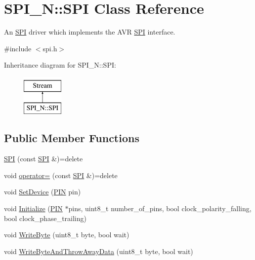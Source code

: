 \hypertarget{class_s_p_i___n_1_1_s_p_i}{}\section{S\+P\+I\+\_\+N\+:\+:S\+PI Class Reference}
\label{class_s_p_i___n_1_1_s_p_i}


An \hyperlink{class_s_p_i___n_1_1_s_p_i}{S\+PI} driver which implements the A\+VR \hyperlink{class_s_p_i___n_1_1_s_p_i}{S\+PI} interface.  




{\ttfamily \#include $<$spi.\+h$>$}

Inheritance diagram for S\+P\+I\+\_\+N\+:\+:S\+PI\+:\begin{figure}[H]
\begin{center}
\leavevmode
\includegraphics[height=2.000000cm]{class_s_p_i___n_1_1_s_p_i}
\end{center}
\end{figure}
\subsection*{Public Member Functions}
\begin{DoxyCompactItemize}
\item 
\hyperlink{class_s_p_i___n_1_1_s_p_i_ab486ba0f0d9ec880520e568762cc6c7d}{S\+PI} (const \hyperlink{class_s_p_i___n_1_1_s_p_i}{S\+PI} \&)=delete
\item 
void \hyperlink{class_s_p_i___n_1_1_s_p_i_aabc66612d396c2b70e5cbdba405dbfe5}{operator=} (const \hyperlink{class_s_p_i___n_1_1_s_p_i}{S\+PI} \&)=delete
\item 
void \hyperlink{class_s_p_i___n_1_1_s_p_i_a23f01675382512e51095ef1d6e257956}{Set\+Device} (\hyperlink{struct_s_p_i___n_1_1_p_i_n}{P\+IN} pin)
\item 
void \hyperlink{class_s_p_i___n_1_1_s_p_i_ab0517cd53e32d224a0171e6eeb200870}{Initialize} (\hyperlink{struct_s_p_i___n_1_1_p_i_n}{P\+IN} $\ast$pins, uint8\+\_\+t number\+\_\+of\+\_\+pins, bool clock\+\_\+polarity\+\_\+falling, bool clock\+\_\+phase\+\_\+trailing)
\item 
void \hyperlink{class_s_p_i___n_1_1_s_p_i_a542dc8e88203de7040ce9926d06b9463}{Write\+Byte} (uint8\+\_\+t byte, bool wait)
\item 
void \hyperlink{class_s_p_i___n_1_1_s_p_i_a05bcca2e033422b2e6ad570320d03fcb}{Write\+Byte\+And\+Throw\+Away\+Data} (uint8\+\_\+t byte, bool wait)
\end{DoxyCompactItemize}
